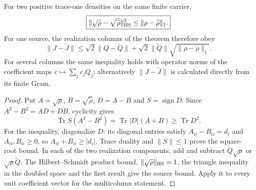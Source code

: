 \documentclass[12pt,a4paper]{article}
\begin{document}
\begin{lemma}
\label{p4:lem:v249-source-state-error}
For two positive trace-one densities on the same finite carrier,
\[
 \boxed{\|\sqrt\rho-\sqrt{\widetilde\rho}\|_{\rm HS}^2
 \le\|\rho-\widetilde\rho\|_1.}
\]
For one source, the realization columns of the theorem therefore obey
\[
 \boxed{\|J-\widetilde J\|
 \le\sqrt2\|Q-\widetilde Q\|
 +\sqrt2\|\widetilde Q\|
                   \sqrt{\|\rho-\widetilde\rho\|_1}.}
\]
For several columns the same inequality holds with operator norms of
the coefficient maps $c\mapsto\sum_jc_jQ_j$; alternatively
$\|J-\widetilde J\|$ is calculated directly from its finite Gram.
\end{lemma}
\begin{proof}
Put $A=\sqrt\rho$, $B=\sqrt{\widetilde\rho}$,
$D=A-B$ and $S=\operatorname{sign}D$. Since
$A^2-B^2=AD+DB$, cyclicity gives
\[
 \operatorname{Tr}S(A^2-B^2)
 =\operatorname{Tr}|D|(A+B)\ge\operatorname{Tr}D^2.
\]
For the inequality, diagonalize $D$: its diagonal entries satisfy
$A_{ii}-B_{ii}=d_i$ and $A_{ii},B_{ii}\ge0$, so
$A_{ii}+B_{ii}\ge|d_i|$. Trace duality and $\|S\|\le1$
prove the square-root bound. In each of the two realization components,
add and subtract $\widetilde Q\sqrt\rho$ or
$\sqrt\rho\widetilde Q$. The Hilbert--Schmidt product bound,
$\|\sqrt\rho\|_{\rm HS}=1$, the triangle inequality in the doubled
space and the first result give the source bound. Apply it to every
unit coefficient vector for the multicolumn statement.
\end{proof}
\end{document}

